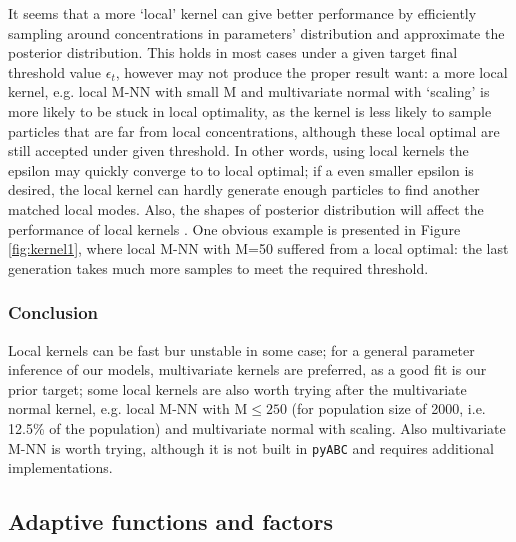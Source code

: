 \documentclass[12pt,a4paper]{report}
\begin{document}
It seems that a more `local' kernel can give better performance by efficiently sampling around concentrations in parameters' distribution and approximate the posterior distribution. This holds in most cases under a given target final threshold value $\epsilon_t$, however may not produce the proper result want: a more local kernel, e.g. local M-NN with small M and multivariate normal with `scaling' is more likely to be stuck in local optimality, as the kernel is less likely to sample particles that are far from local concentrations, although these local optimal are still accepted under given threshold. In other words, using local kernels the epsilon may quickly converge to to local optimal; if a even smaller epsilon is desired, the local kernel can hardly generate enough particles to find another matched local modes. Also, the shapes of posterior distribution will affect the performance of local kernels \cite{ref:kernel}. One obvious example is presented in Figure \ref{fig:kernel1}, where local M-NN with M=50 suffered from a local optimal: the last generation takes much more samples to meet the required threshold.

\subsubsection{Conclusion} Local kernels can be fast bur unstable in some case; for a general parameter inference of our models, multivariate kernels are preferred, as a good fit is our prior target; some local kernels are also worth trying after the multivariate normal kernel, e.g. local M-NN with M$\leq 250$ (for population size of 2000, i.e. 12.5\% of the population) and multivariate normal with scaling. Also multivariate M-NN is worth trying, although it is not built in \verb|pyABC| and requires additional implementations.






\subsection{Adaptive functions and factors}
\end{document}
